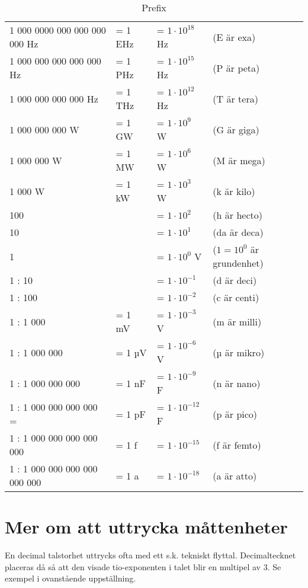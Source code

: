 \begin{table}[h]
  \caption{Prefix}
  \label{tab:prefix}
  \begin{tabular}{|llll|}
    \hline
    1 000 0000 000 000 000 000 Hz & = 1 EHz & = \(1 \cdot 10^{18}\) Hz & (E är exa) \\
    1 000 000 000 000 000 Hz & = 1 PHz & = \(1 \cdot 10^{15}\) Hz & (P är peta) \\
    1 000 000 000 000 Hz & = 1 THz & = \(1 \cdot 10^{12}\) Hz & (T är tera) \\
    1 000 000 000 W & = 1 GW & = \(1 \cdot 10^9\) W & (G är giga) \\
    1 000 000 W & = 1 MW & = \(1 \cdot 10^6\) W & (M är mega) \\
    1 000 W & = 1 kW & = \(1 \cdot 10^3\) W & (k är kilo) \\
    100 & & = \(1 \cdot 10^2\) & (h är hecto) \\
    10 & & = \(1 \cdot 10^1\) & (da är deca) \\
    1 & & = \(1 \cdot 10^0\) V & (\(1 = 10^0\) är grundenhet) \\
    1 : 10 & & = \(1 \cdot 10^{-1}\) & (d är deci) \\
    1 : 100 & & = \(1 \cdot 10^{-2}\) & (c är centi) \\
    1 : 1 000 & = 1 mV & = \(1 \cdot 10^{-3}\) V & (m är milli) \\
    1 : 1 000 000 & = 1 µV & = \(1 \cdot 10^{-6}\) V & (µ är mikro) \\
    1 : 1 000 000 000 & = 1 nF & = \(1 \cdot 10^{-9}\) F & (n är nano) \\
    1 : 1 000 000 000 000 = & = 1 pF & = \(1 \cdot 10^{-12}\) F & (p är pico) \\
    1 : 1 000 000 000 000 000 & = 1 f & = \(1 \cdot 10^{-15}\) & (f är femto) \\
    1 : 1 000 000 000 000 000 000 & = 1 a & = \(1 \cdot 10^{-18}\) & (a är atto) \\
    \hline
  \end{tabular}
\end{table}


\section{Mer om att uttrycka måttenheter}

En decimal talstorhet uttrycks ofta med ett s.k. tekniskt flyttal.
Decimaltecknet placeras då så att den visade tio-exponenten i talet
blir en multipel av 3. Se exempel i ovanstående uppställning.

